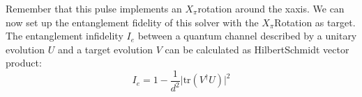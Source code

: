 \documentclass[letterpaper,10pt,english]{sphinxmanual}
\begin{document}
{\begin{sphinxVerbatim}[commandchars=\\\{\}]
  \PYG{p}{[}     \PYG{p}{]}
  \PYG{p}{[}    \PYG{p}{]}

  
  

       

   
\PYG{p}{[} \PYG{p}{]}  

  
      
\end{sphinxVerbatim}
}

Remember that this pulse implements an \(X_\pi\)\sphinxhyphen{}rotation around the x\sphinxhyphen{}axis. We can now set up the entanglement fidelity of this solver with the \(X_\pi\)\sphinxhyphen{}Rotation as target. The entanglement infidelity \(I_e\) between a quantum channel described by a unitary evolution \(U\) and a target evolution \(V\) can be calculated as Hilbert\sphinxhyphen{}Schmidt vector product: \begin{equation}
I_e = 1 - \frac{1}{d^2}\vert \text{tr}\left( V^\dagger U \right)|^2
\end{equation}
\end{document}
